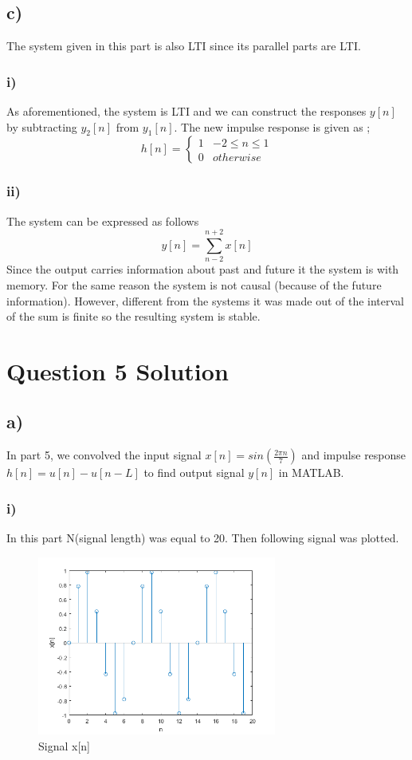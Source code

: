 \documentclass[letterpaper,12pt]{article}
\begin{document}
\subsection{c)}
The system given in this part is also LTI since its parallel parts are LTI.
\subsubsection{i)}
As aforementioned, the system is LTI and we can construct the responses \(y[n]\) by subtracting \(y_2[n]\) from \(y_1[n]\). The new impulse response is given as ; 
\[
h[n] = \begin{cases} 
    1 & -2 \leq n \leq 1 \\
    0 & otherwise 
 \end{cases}    
\]

\subsubsection{ii)}
The system can be expressed as follows 
\[
y[n] = \sum_{n-2}^{n+2} x[n]    
\] 
Since the output carries information about past and future it the system is with memory. For the same reason the system is not causal (because  of the future information). However, different from the systems it was made out of the interval of the sum is finite so the resulting system is stable. 
\section{Question 5 Solution}
\subsection{a)}
In part 5, we convolved the input signal \(x[n] = sin(\frac{2\pi n}{7} )\) and impulse response \(h[n] = u[n] - u[n-L]\) to find output signal \(y[n]\) in MATLAB.
\subsubsection{i)}
In this part N(signal length) was equal to 20. Then following signal was plotted.
\begin{figure}[H]
    \centering
    \includegraphics[width = 0.7\textwidth]{i.png}
    \caption{Signal x[n]}
    \end{figure} 
    
\end{document}
